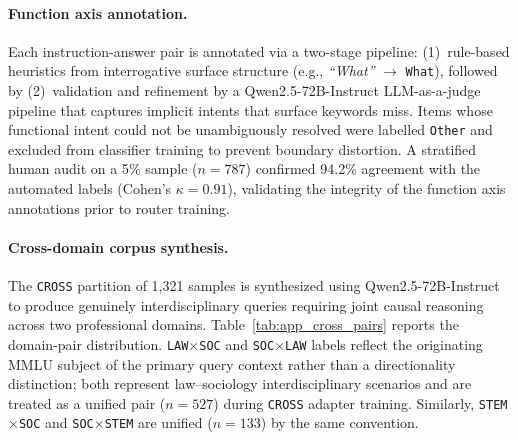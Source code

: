 \documentclass[a4paper,fleql]{cas-sc}
\begin{document}
\paragraph{Function axis annotation.}
Each instruction-answer pair is annotated via a two-stage pipeline:
(1)~rule-based heuristics from interrogative surface structure (e.g.,
\textit{``What''} $\to$ \texttt{What}), followed by (2)~validation and
refinement by a Qwen2.5-72B-Instruct LLM-as-a-judge pipeline that captures
implicit intents that surface keywords miss. Items whose functional intent
could not be unambiguously resolved were labelled \texttt{Other} and
excluded from classifier training to prevent boundary distortion. A
stratified human audit on a 5\% sample ($n{=}787$) confirmed 94.2\%
agreement with the automated labels (Cohen's $\kappa = 0.91$), validating
the integrity of the function axis annotations prior to router training.

\paragraph{Cross-domain corpus synthesis.}
The \texttt{CROSS} partition of 1,321 samples is synthesized using
Qwen2.5-72B-Instruct to produce genuinely interdisciplinary queries
requiring joint causal reasoning across two professional domains.
Table~\ref{tab:app_cross_pairs} reports the domain-pair distribution.
\texttt{LAW$\times$SOC} and \texttt{SOC$\times$LAW} labels reflect the
originating MMLU subject of the primary query context rather than a
directionality distinction; both represent law--sociology interdisciplinary
scenarios and are treated as a unified pair ($n{=}527$) during
\texttt{CROSS} adapter training. Similarly, \texttt{STEM$\times$SOC} and
\texttt{SOC$\times$STEM} are unified ($n{=}133$) by the same convention.
\end{document}
